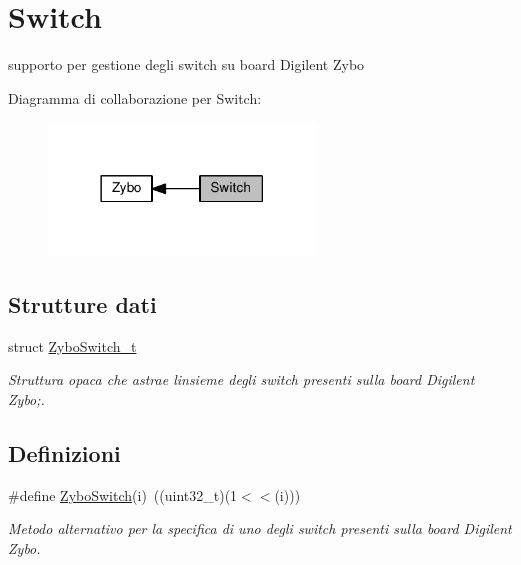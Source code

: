 \hypertarget{group___switch}{}\section{Switch}
\label{group___switch}


supporto per gestione degli switch su board Digilent Zybo  


Diagramma di collaborazione per Switch\+:\nopagebreak
\begin{figure}[H]
\begin{center}
\leavevmode
\includegraphics[width=201pt]{group___switch}
\end{center}
\end{figure}
\subsection*{Strutture dati}
\begin{DoxyCompactItemize}
\item 
struct \hyperlink{struct_zybo_switch__t}{Zybo\+Switch\+\_\+t}
\begin{DoxyCompactList}\small\item\em Struttura opaca che astrae l\textquotesingle{}insieme degli switch presenti sulla board Digilent Zybo;. \end{DoxyCompactList}\end{DoxyCompactItemize}
\subsection*{Definizioni}
\begin{DoxyCompactItemize}
\item 
\#define \hyperlink{group___switch_ga1c463f6e1e3a43f68109c176772ce5cc}{Zybo\+Switch}(i)~((uint32\+\_\+t)(1$<$$<$(i)))
\begin{DoxyCompactList}\small\item\em Metodo alternativo per la specifica di uno degli switch presenti sulla board Digilent Zybo. \end{DoxyCompactList}\end{DoxyCompactItemize}
